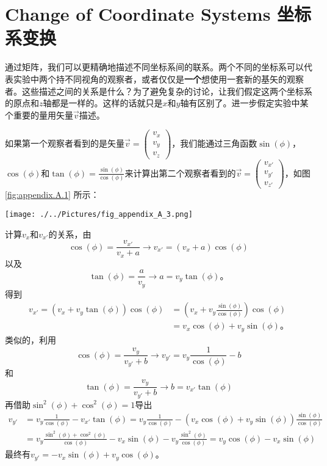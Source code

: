 \section[坐标系变换]{Change of Coordinate Systems 坐标系变换}\label{appendix.A.2}
通过矩阵，我们可以更精确地描述不同坐标系间的联系。两个不同的坐标系可以代表实验中两个持不同视角的观察者，或者仅仅是{\bf 一个}想使用一套新的基矢的观察者。这些描述之间的关系是什么？为了避免复杂的讨论，让我们假定这两个坐标系的原点和$z$轴都是一样的。这样的话就只是$x$和$y$轴有区别了。进一步假定实验中某个重要的量用矢量$\vec{v}$描述。

如果第一个观察者看到的是矢量$\vec{v}= \begin{pmatrix}
v_x \\ v_y \\ v_z
\end{pmatrix}$，我们能通过三角函数$\sin(\phi)$，$\cos(\phi)$和$\tan(\phi)=\frac{\sin(\phi)}{\cos(\phi)}$来计算出第二个观察者看到的$\vec{v}= \begin{pmatrix}
v_{x'} \\ v_{y'} \\ v_{z'}
\end{pmatrix}$，如图\ref{fig:appendix.A.1} 所示：

\texttt{[image: ./../Pictures/fig\_appendix\_A\_3.png]}

计算$v_x$和$v_{x'}$的关系，由
\[
\cos(\phi)=\frac{v_{x'}}{v_x+a} \rightarrow v_{x'}=(v_x+a)\cos(\phi)
\]
以及
\[
\tan(\phi)=\frac{a}{v_y}\rightarrow a=v_y\tan(\phi)\text{。}
\]
得到
\[
\begin{aligned}
v_{x'}=(v_x+v_y\tan(\phi))\cos(\phi)&=\left(v_x+v_y\frac{\sin(\phi)}{\cos(\phi)}\right)\cos(\phi) \\
 & = v_x\cos(\phi)+v_y\sin(\phi)\text{。}
\end{aligned}
\]
类似的，利用
\[
\cos(\phi) = \frac{v_y}{v_{y'}+b}\rightarrow v_{y'}=v_y\frac{1}{\cos(\phi)}-b
\]
和
\[
\tan(\phi)=\frac{v_y}{v_{y'}+b}\rightarrow b=v_{x'}\tan(\phi)
\]
再借助$\sin^2(\phi)+\cos^2(\phi)=1$导出
\[\begin{split}
v_{y'}&=v_y\frac{1}{\cos(\phi)}-v_{x'}\tan(\phi)=v_y\frac{1}{\cos(\phi)}-(v_x\cos(\phi)+v_y\sin(\phi))\frac{\sin(\phi)}{\cos(\phi)}  \\
&= v_y\frac{\sin^2(\phi)+\cos^2(\phi)}{\cos(\phi)}-v_x\sin(\phi)-v_y\frac{\sin^2(\phi)}{\cos(\phi)} = v_y\cos(\phi)-v_x\sin(\phi)
\end{split}\]
最终有$v_{y'}=-v_x\sin(\phi)+v_y\cos(\phi)$。

